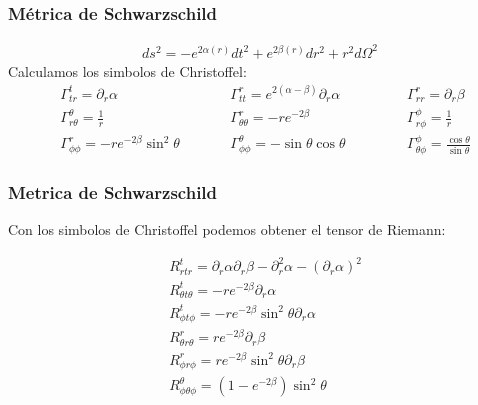 \documentclass{beamer}
\begin{document}


\begin{frame}
\frametitle{Métrica de Schwarzschild}

\begin{gather*}
  ds^2 = - e ^ {2\alpha(r)}dt^2 + e ^ {2 \beta (r) } dr^2 + r^2 d \Omega^2  
\end{gather*}
Calculamos los simbolos de Christoffel:
\begin{align*}
  &\Gamma_{t r}^t=\partial _r \alpha \qquad &&\Gamma_{t t}^r=e^{2(\alpha-\beta)} \partial_r \alpha \qquad &&&\Gamma_{r r}^{r}=\partial_r \beta \\
  &\Gamma_{r \theta}^\theta=\frac{1}{r} \qquad &&\Gamma_{\theta \theta}^r=-r e^{-2 \beta} \qquad &&&\Gamma_{r \phi}^\phi=\frac{1}{r} \\
  &\Gamma_{\phi \phi}^r=-r e^{-2 \beta} \sin ^2 \theta \qquad &&\Gamma_{\phi \phi}^\theta=-\sin \theta \cos \theta \qquad &&&\Gamma_{\theta \phi}^\phi=\frac{\cos \theta}{\sin \theta}
\end{align*}
\end{frame}




\begin{frame}
\frametitle{Metrica de Schwarzschild}

Con los simbolos de Christoffel podemos obtener el tensor de Riemann: 

\begin{align*}
  &R_{r t r}^{t}=\partial_r \alpha \partial_r \beta-\partial_r^2 \alpha-(\partial_r \alpha)^2 \\
  &R_{\theta t \theta }^{t}=-r e^{-2 \beta} \partial_r \alpha \\
  &R_{\phi t \phi}^t=-r e^{-2 \beta} \sin ^2 \theta \partial_r \alpha \\
  &R_{\theta r \theta}^r=r e^{-2 \beta} \partial_r \beta \\
  &R_{\phi r \phi}^{r}=r e^{-2 \beta} \sin ^2 \theta \partial_r \beta \\
  &R _{\phi \theta \phi } ^ {\theta }=\left(1-e^{-2 \beta}\right) \sin ^2 \theta 
\end{align*}


\end{frame}


\end{document}

